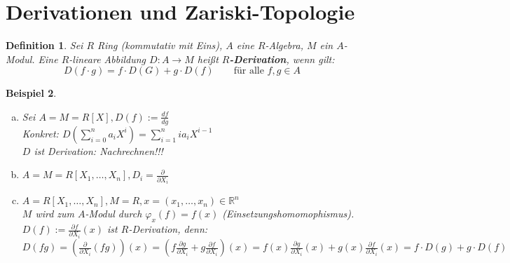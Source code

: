 \documentclass[a4paper,12pt]{report}
\theoremstyle{break}
\newtheorem{Def}{Definition}[section]
\newtheorem{Bsp}[Def]{Beispiel}
\theoremstyle{nonumberbreak}
\theoremstyle{nonumberplain}
\newcommand{\emp}[1]{\textbf{\emph{#1}}}
\newcommand{\begriffspez}[2]{{\index{#2}}\emp{#1}}
\newcommand{\R}{\mathbb{R}}
\begin{document}
\newpage


\section{Derivationen und Zariski-Topologie}

\begin{Def}\label{Def17.1}
Sei $R$ Ring (kommutativ mit Eins), $A$ eine $R$-Algebra, $M$ ein $A$-Modul. Eine $R$-lineare Abbildung $D:A\to M$ hei\ss t \begriffspez{$R$-Derivation}{Derivation}, wenn gilt:
	\[ D(f\cdot g)=f\cdot D(G) + g\cdot D(f) \qquad \text{f\"ur alle }f,g \in A\]
\end{Def}

\begin{Bsp}\label{Bsp17.2}\begin{enumerate}[a)]
\item\label{Bsp17.2a}
	Sei $A=M=R[X], D(f):=\frac{df}{dg}$\\
	Konkret: $D(\sum\limits_{i=0}^n a_iX^i)=\sum\limits_{i=1}^nia_iX^{i-1}$\\
	$D$ ist Derivation: Nachrechnen!!!
\item
	$A=M=R[X_1,\ldots ,X_n], D_i=\frac{\partial}{\partial X_i}$
\item\label{Bsp17.2c}
	$A=R[X_1,\ldots ,X_n], M=R, x=(x_1,\ldots ,x_n)\in \R^n$\\
	$M$ wird zum $A$-Modul durch $\varphi_x(f)=f(x)$ (Einsetzungshomomophismus).\\
	$D(f):=\frac{\partial f}{\partial X_i}(x)$ ist $R$-Derivation, \emph{denn:}\\
	$D(fg)=(\frac{\partial}{\partial X_i}(fg))(x)=(f\frac{\partial g}{\partial X_i}+g\frac{\partial f}{\partial X_i})(x) = f(x)\frac{\partial g}{\partial X_i}(x) + g(x)\frac{\partial f}{\partial X_i}(x) = f\cdot D(g) + g\cdot D(f)$
\end{enumerate}\end{Bsp}
\end{document}
